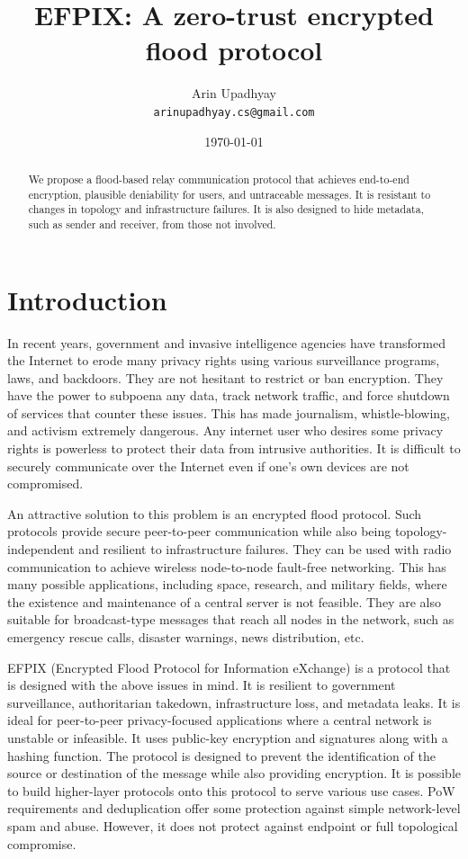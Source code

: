 \documentclass{article}
\title{\textbf{EFPIX: A zero-trust encrypted flood protocol}}
\author{Arin Upadhyay \\ \texttt{arinupadhyay.cs@gmail.com}}
\date{\today}
\begin{document}
\maketitle

\begin{abstract}
We propose a flood-based relay communication protocol that achieves end-to-end encryption, plausible deniability for users, and untraceable messages. It is resistant to changes in topology and infrastructure failures.  It is also designed to hide metadata, such as sender and receiver, from those not involved.
\end{abstract}

\section{Introduction}
In recent years, government and invasive intelligence agencies have transformed the Internet to erode many privacy rights using various surveillance programs, laws, and backdoors. \cite{bamford2012} \cite{heilman2014} \cite{pegasus2023} They are not hesitant to restrict or ban encryption. \cite{apple2025} They have the power to subpoena any data, track network traffic, and force shutdown of services that counter these issues. This has made journalism, whistle-blowing, and activism extremely dangerous. \cite{snowden2014} Any internet user who desires some privacy rights is powerless to protect their data from intrusive authorities. It is difficult to securely communicate over the Internet even if one's own devices are not compromised. 

An attractive solution to this problem is an encrypted flood protocol. Such protocols provide secure peer-to-peer communication while also being topology-independent and resilient to infrastructure failures. They can be used with radio communication to achieve wireless node-to-node fault-free networking. This has many possible applications, including space, research, and military fields, where the existence and maintenance of a central server is not feasible. They are also suitable for broadcast-type messages that reach all nodes in the network, such as emergency rescue calls, disaster warnings, news distribution, etc. 

EFPIX (Encrypted Flood Protocol for Information eXchange) is a protocol that is designed with the above issues in mind. It is resilient to government surveillance, authoritarian takedown, infrastructure loss, and metadata leaks. It is ideal for peer-to-peer privacy-focused applications where a central network is unstable or infeasible. It uses public-key encryption and signatures along with a hashing function. The protocol is designed to prevent the identification of the source or destination of the message while also providing encryption. It is possible to build higher-layer protocols onto this protocol to serve various use cases. PoW requirements and deduplication offer some protection against simple network-level spam and abuse. However, it does not protect against endpoint or full topological compromise.
\end{document}
